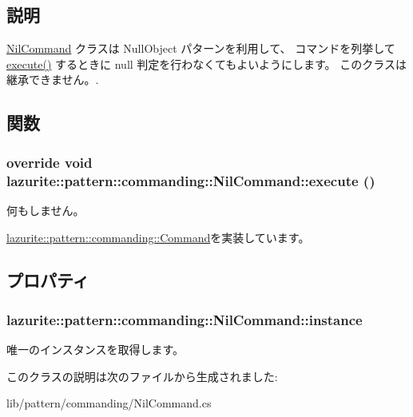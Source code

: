 \subsection{説明}
\hyperlink{classlazurite_1_1pattern_1_1commanding_1_1_nil_command}{NilCommand} クラスは NullObject パターンを利用して、 コマンドを列挙して \hyperlink{classlazurite_1_1pattern_1_1commanding_1_1_nil_command_a1e4264d6178861597779826267d5ac4c}{execute()} するときに null 判定を行わなくてもよいようにします。 このクラスは継承できません。. 

\subsection{関数}
\hypertarget{classlazurite_1_1pattern_1_1commanding_1_1_nil_command_a1e4264d6178861597779826267d5ac4c}{
\subsubsection[{execute}]{\setlength{\rightskip}{0pt plus 5cm}override void lazurite::pattern::commanding::NilCommand::execute ()}}
\label{classlazurite_1_1pattern_1_1commanding_1_1_nil_command_a1e4264d6178861597779826267d5ac4c}


何もしません。 

\hyperlink{classlazurite_1_1pattern_1_1commanding_1_1_command_afd9750cf772a6a65b1a1e11d8313fe03}{lazurite::pattern::commanding::Command}を実装しています。

\subsection{プロパティ}
\hypertarget{classlazurite_1_1pattern_1_1commanding_1_1_nil_command_ae926216e2d1dd8802f946a4423adea04}{
\subsubsection[{instance}]{ lazurite::pattern::commanding::NilCommand::instance}}
\label{classlazurite_1_1pattern_1_1commanding_1_1_nil_command_ae926216e2d1dd8802f946a4423adea04}


唯一のインスタンスを取得します。 

このクラスの説明は次のファイルから生成されました:\begin{DoxyCompactItemize}
\item 
lib/pattern/commanding/NilCommand.cs\end{DoxyCompactItemize}
